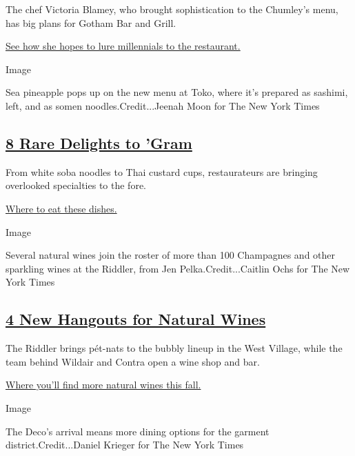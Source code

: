 The chef Victoria Blamey, who brought sophistication to the Chumley's
menu, has big plans for Gotham Bar and Grill.

\href{https://www.nytimes3xbfgragh.onion/2019/09/03/dining/gotham-bar-and-grill-victoria-blamey.html}{See
how she hopes to lure millennials to the restaurant.}

Image

Sea pineapple pops up on the new menu at Toko, where it's prepared as
sashimi, left, and as somen noodles.Credit...Jeenah Moon for The New
York Times

\hypertarget{8-rare-delights-to-gram}{%
\subsection{\texorpdfstring{\href{https://www.nytimes3xbfgragh.onion/2019/09/03/dining/food-to-eat-right-now.html}{8
Rare Delights to
'Gram}}{8 Rare Delights to 'Gram}}\label{8-rare-delights-to-gram}}

From white soba noodles to Thai custard cups, restaurateurs are bringing
overlooked specialties to the fore.

\href{https://www.nytimes3xbfgragh.onion/2019/09/03/dining/food-to-eat-right-now.html}{Where
to eat these dishes.}

Image

Several natural wines join the roster of more than 100 Champagnes and
other sparkling wines at the Riddler, from Jen Pelka.Credit...Caitlin
Ochs for The New York Times

\hypertarget{4-new-hangouts-for-natural-wines}{%
\subsection{\texorpdfstring{\href{https://www.nytimes3xbfgragh.onion/2019/09/03/dining/drinks/natural-wine-bars-nyc.html}{4
New Hangouts for Natural
Wines}}{4 New Hangouts for Natural Wines}}\label{4-new-hangouts-for-natural-wines}}

The Riddler brings pét-nats to the bubbly lineup in the West Village,
while the team behind Wildair and Contra open a wine shop and bar.

\href{https://www.nytimes3xbfgragh.onion/2019/09/03/dining/drinks/natural-wine-bars-nyc.html}{Where
you'll find more natural wines this fall.}

Image

The Deco's arrival means more dining options for the garment
district.Credit...Daniel Krieger for The New York Times

